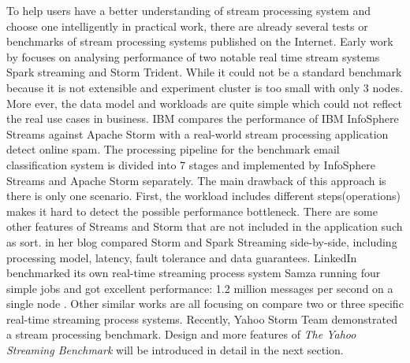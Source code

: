 To help users have a better understanding of stream processing system and choose one intelligently in practical work, there are already several tests or benchmarks of stream processing systems published on the Internet. Early work by \citet{cordovaanalysis} focuses on analysing performance of two notable real time stream systems Spark streaming and Storm Trident. While it could not be a standard benchmark because it is not extensible and experiment cluster is too small with only 3 nodes. More ever, the data model and workloads are quite simple which could not reflect the real use cases in business. IBM compares the performance of IBM InfoSphere Streams against Apache Storm with a real-world stream processing application detect online spam. \cite{ibm2014streams} The processing pipeline for the benchmark email classification system is divided into 7 stages and implemented by InfoSphere Streams and Apache Storm separately. The main drawback of this approach is there is only one scenario. First, the workload includes different steps(operations) makes it hard to detect the possible performance bottleneck. There are some other features of Streams and Storm that are not included in the application such as sort. \citet{xinhstechblog} in her blog compared Storm and Spark Streaming side-by-side, including processing model, latency, fault tolerance and data guarantees. LinkedIn benchmarked its own real-time streaming process system Samza running four simple jobs and got excellent performance: 1.2 million messages per second on a single node \cite{samza-benchmark}. Other similar works \cite{manoj-sotrm-vs-spark,flink-latency} are all focusing on compare two or three specific real-time streaming process systems. Recently, Yahoo Storm Team demonstrated a stream processing benchmark. Design and more features of \textit{The Yahoo Streaming Benchmark} will be introduced in detail in the next section.

